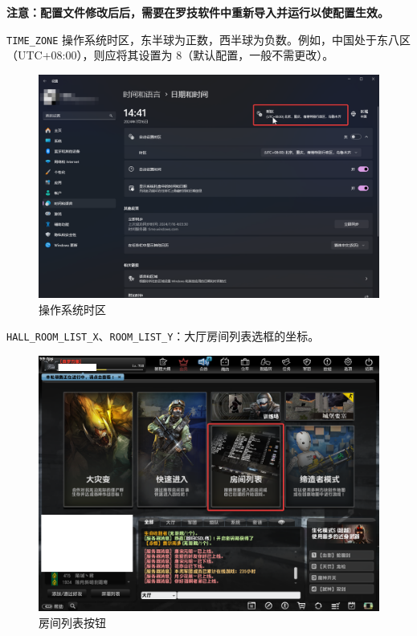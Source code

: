 \textbf{\color{red}注意：配置文件修改后后，需要在罗技软件中重新导入并运行以使配置生效。}

\lstinline{TIME_ZONE} 操作系统时区，东半球为正数，西半球为负数。例如，中国处于东八区（UTC+08:00），则应将其设置为 8（默认配置，一般不需更改）。

\begin{figure}[H]
    \Centering
    \includegraphics[width=\textwidth]{docs/assets/timezone.png}
    \caption{操作系统时区}
\end{figure}

\lstinline{HALL_ROOM_LIST_X}、\lstinline{ROOM_LIST_Y}：大厅房间列表选框的坐标。

\begin{figure}[H]
    \Centering
    \includegraphics[width=\textwidth]{docs/assets/room_list.png}
    \caption{房间列表按钮}
\end{figure}

